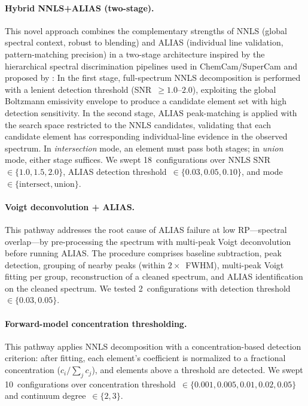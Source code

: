 \paragraph{Hybrid NNLS+ALIAS (two-stage).}
This novel approach combines the complementary strengths of NNLS (global spectral context, robust to blending) and ALIAS (individual line validation, pattern-matching precision) in a two-stage architecture inspired by the hierarchical spectral discrimination pipelines used in ChemCam/SuperCam \citep{Wiens2013,Clegg2017} and proposed by \citet{Eum2021}:
In the first stage, full-spectrum NNLS decomposition is performed with a lenient detection threshold (SNR~$\geq 1.0$--$2.0$), exploiting the global Boltzmann emissivity envelope to produce a candidate element set with high detection sensitivity.
In the second stage, ALIAS peak-matching is applied with the search space restricted to the NNLS candidates, validating that each candidate element has corresponding individual-line evidence in the observed spectrum.
In \emph{intersection} mode, an element must pass both stages; in \emph{union} mode, either stage suffices.
We swept 18~configurations over NNLS SNR~$\in \{1.0, 1.5, 2.0\}$, ALIAS detection threshold~$\in \{0.03, 0.05, 0.10\}$, and mode~$\in \{\text{intersect}, \text{union}\}$.

\paragraph{Voigt deconvolution + ALIAS.}
This pathway addresses the root cause of ALIAS failure at low RP---spectral overlap---by pre-processing the spectrum with multi-peak Voigt deconvolution \citep{AlJalali2016,Dai2026} before running ALIAS.
The procedure comprises baseline subtraction, peak detection, grouping of nearby peaks (within $2 \times$~FWHM), multi-peak Voigt fitting per group, reconstruction of a cleaned spectrum, and ALIAS identification on the cleaned spectrum.
We tested 2~configurations with detection threshold~$\in \{0.03, 0.05\}$.

\paragraph{Forward-model concentration thresholding.}
This pathway applies NNLS decomposition with a concentration-based detection criterion: after fitting, each element's coefficient is normalized to a fractional concentration ($c_i / \sum_j c_j$), and elements above a threshold are detected.
We swept 10~configurations over concentration threshold~$\in \{0.001, 0.005, 0.01, 0.02, 0.05\}$ and continuum degree~$\in \{2, 3\}$.


